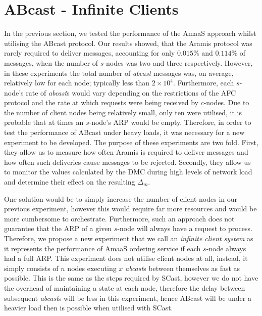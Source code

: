 \section{ABcast - Infinite Clients}
    In the previous section, we tested the performance of the \textsf{AmaaS} approach whilst utilising the \textsf{ABcast} protocol.  Our results showed, that the \textsf{Aramis} protocol was rarely required to deliver messages, accounting for only $0.015\%$ and $0.114\%$ of messages, when the number of $s$-nodes was two and three respectively.  However, in these experiments the total number of \emph{abcast} messages was, on average, relatively low for each node; typically less than $2 \times 10^4$.  Furthermore, each $s$-node's rate of \emph{abcast}s would vary depending on the restrictions of the AFC protocol and the rate at which requests were being received by $c$-nodes.  Due to the number of client nodes being relatively small, only ten were utilised, it is probable that at times an $s$-node's ARP would be empty.  Therefore, in order to test the performance of \textsf{ABcast} under heavy loads, it was necessary for a new experiment to be developed.  The purpose of these experiments are two fold.  First, they allow us to measure how often \textsf{Aramis} is required to deliver messages and how often such deliveries cause messages to be rejected.  Secondly, they allow us to monitor the values calculated by the DMC during high levels of network load and determine their effect on the resulting $\Delta_m$.  
    
    One solution would be to simply increase the number of client nodes in our previous experiment, however this would require far more resources and would be more cumbersome to orchestrate.  Furthermore, such an approach does not guarantee that the ARP of a given $s$-node will always have a request to process.  Therefore, we propose a new experiment that we call an \emph{infinite client system} as it represents the performance of \textsf{AmaaS} ordering service if each $s$-node always had a full ARP.  This experiment does not utilise client nodes at all, instead, it simply consists of $n$ nodes executing $x$ \emph{abcast}s between themselves as fast as possible.  This is the same as the steps required by \textsf{SCast}, however we do not have the overhead of maintaining a state at each node, therefore the delay between subsequent \emph{abcast}s will be less in this experiment, hence \textsf{ABcast} will be under a heavier load then is possible when utilised with \textsf{SCast}. 
    
